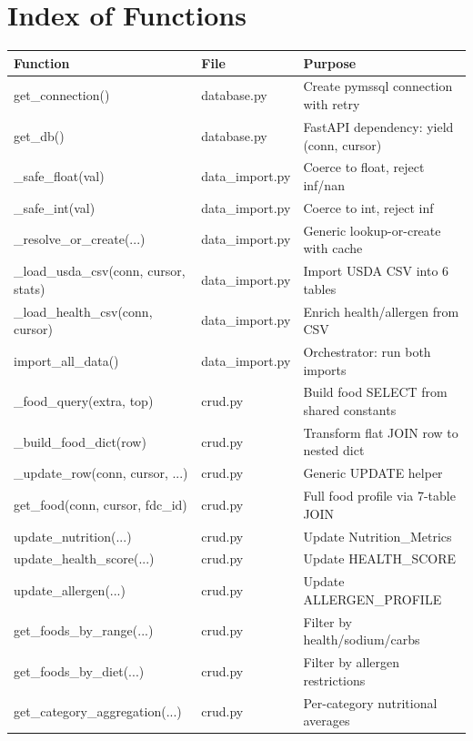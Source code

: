 \documentclass[12pt,a4paper]{article}
\begin{document}
\section{Index of Functions}

\begin{longtable}{p{4.8cm}p{3.5cm}p{7.2cm}}
\toprule
\textbf{Function} & \textbf{File} & \textbf{Purpose} \\
\midrule
get\_connection() & database.py & Create pymssql connection with retry \\
get\_db() & database.py & FastAPI dependency: yield (conn, cursor) \\
\midrule
\_safe\_float(val) & data\_import.py & Coerce to float, reject inf/nan \\
\_safe\_int(val) & data\_import.py & Coerce to int, reject inf \\
\_resolve\_or\_create(...) & data\_import.py & Generic lookup-or-create with cache \\
\_load\_usda\_csv(conn, cursor, stats) & data\_import.py & Import USDA CSV into 6 tables \\
\_load\_health\_csv(conn, cursor) & data\_import.py & Enrich health/allergen from CSV \\
import\_all\_data() & data\_import.py & Orchestrator: run both imports \\
\midrule
\_food\_query(extra, top) & crud.py & Build food SELECT from shared constants \\
\_build\_food\_dict(row) & crud.py & Transform flat JOIN row to nested dict \\
\_update\_row(conn, cursor, ...) & crud.py & Generic UPDATE helper \\
get\_food(conn, cursor, fdc\_id) & crud.py & Full food profile via 7-table JOIN \\
update\_nutrition(...) & crud.py & Update Nutrition\_Metrics \\
update\_health\_score(...) & crud.py & Update HEALTH\_SCORE \\
update\_allergen(...) & crud.py & Update ALLERGEN\_PROFILE \\
get\_foods\_by\_range(...) & crud.py & Filter by health/sodium/carbs \\
get\_foods\_by\_diet(...) & crud.py & Filter by allergen restrictions \\
get\_category\_aggregation(...) & crud.py & Per-category nutritional averages \\

\end{longtable}
\end{document}
